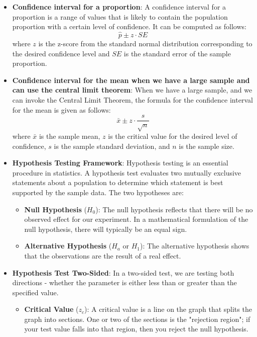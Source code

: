 \documentclass{article}
\begin{document}
\begin{itemize}
\item \textbf{Confidence interval for a proportion}: A confidence interval for a proportion is a range of values that is likely to contain the population proportion with a certain level of confidence. It can be computed as follows:
\[ \hat{p} \pm z \cdot SE \] 
where $z$ is the z-score from the standard normal distribution corresponding to the desired confidence level and $SE$ is the standard error of the sample proportion.

\item \textbf{Confidence interval for the mean when we have a large sample and can use the central limit theorem}: When we have a large sample, and we can invoke the Central Limit Theorem, the formula for the confidence interval for the mean is given as follows:
\[ \bar{x} \pm z \cdot \frac{s}{\sqrt{n}} \] 
where $\bar{x}$ is the sample mean, $z$ is the critical value for the desired level of confidence, $s$ is the sample standard deviation, and $n$ is the sample size.

\item \textbf{Hypothesis Testing Framework}: Hypothesis testing is an essential procedure in statistics. A hypothesis test evaluates two mutually exclusive statements about a population to determine which statement is best supported by the sample data. The two hypotheses are: 

\begin{itemize} 

\item \textbf{Null Hypothesis} ($H_0$): The null hypothesis reflects that there will be no observed effect for our experiment. In a mathematical formulation of the null hypothesis, there will typically be an equal sign.

\item \textbf{Alternative Hypothesis} ($H_a$ or $H_1$): The alternative hypothesis shows that the observations are the result of a real effect.

\end{itemize}

\item \textbf{Hypothesis Test Two-Sided}: In a two-sided test, we are testing both directions - whether the parameter is either less than or greater than the specified value. 

\begin{itemize} 

\item \textbf{Critical Value} ($z_c$): A critical value is a line on the graph that splits the graph into sections. One or two of the sections is the "rejection region"; if your test value falls into that region, then you reject the null hypothesis.


\end{itemize}
\end{itemize}
\end{document}
